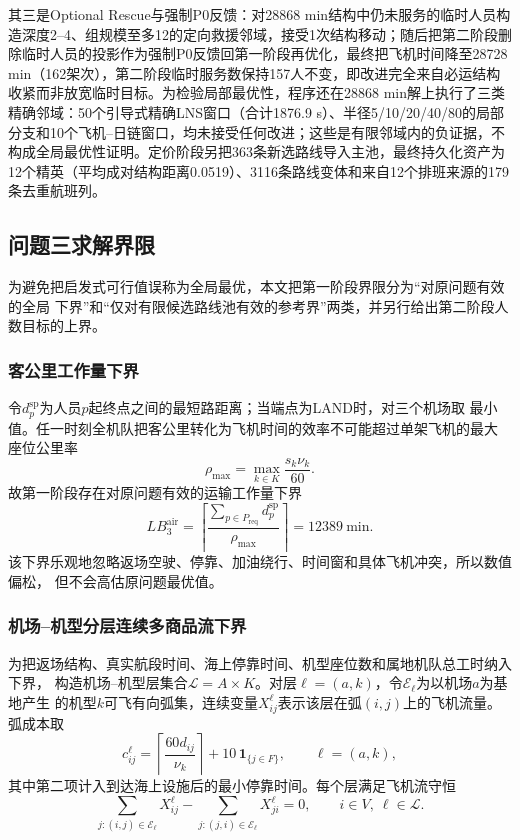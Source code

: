 \documentclass[UTF8,a4paper,zihao=5]{ctexart}
\begin{document}
其三是Optional Rescue与强制P0反馈：对28868 min结构中仍未服务的临时人员构造深度2--4、组规模至多12的定向救援邻域，接受1次结构移动；随后把第二阶段删除临时人员的投影作为强制P0反馈回第一阶段再优化，最终把飞机时间降至28728 min（162架次），第二阶段临时服务数保持157人不变，即改进完全来自必运结构收紧而非放宽临时目标。为检验局部最优性，程序还在28868 min解上执行了三类精确邻域：50个引导式精确LNS窗口（合计1876.9 s）、半径5/10/20/40/80的局部分支和10个飞机--日链窗口，均未接受任何改进；这些是有限邻域内的负证据，不构成全局最优性证明。定价阶段另把363条新选路线导入主池，最终持久化资产为12个精英（平均成对结构距离0.0519）、3116条路线变体和来自12个排班来源的179条去重航班列。

\subsection{问题三求解界限}

为避免把启发式可行值误称为全局最优，本文把第一阶段界限分为“对原问题有效的全局
下界”和“仅对有限候选路线池有效的参考界”两类，并另行给出第二阶段人数目标的上界。

\subsubsection{客公里工作量下界}

令$d_p^{\mathrm{sp}}$为人员$p$起终点之间的最短路距离；当端点为LAND时，对三个机场取
最小值。任一时刻全机队把客公里转化为飞机时间的效率不可能超过单架飞机的最大
座位公里率
\begin{equation}
  \rho_{\max}=\max_{k\in K}\frac{s_k\nu_k}{60}.
  \label{eq:q3-seat-km-rate}
\end{equation}
故第一阶段存在对原问题有效的运输工作量下界
\begin{equation}
  LB_3^{\mathrm{air}}
  =\left\lceil
  \frac{\sum_{p\in P_{\mathrm{req}}}d_p^{\mathrm{sp}}}{\rho_{\max}}
  \right\rceil=12389\ \mathrm{min}.
  \label{eq:q3-aircraft-time-lb}
\end{equation}
该下界乐观地忽略返场空驶、停靠、加油绕行、时间窗和具体飞机冲突，所以数值偏松，
但不会高估原问题最优值。

\subsubsection{机场--机型分层连续多商品流下界}

为把返场结构、真实航段时间、海上停靠时间、机型座位数和属地机队总工时纳入下界，
构造机场--机型层集合$\mathcal{L}=A\times K$。对层$\ell=(a,k)$，令$\mathcal{E}_\ell$为以机场$a$为基地产生
的机型$k$可飞有向弧集，连续变量$X_{ij}^{\ell}$表示该层在弧$(i,j)$上的飞机流量。弧成本取
\begin{equation}
  c_{ij}^{\ell}=\left\lceil\frac{60d_{ij}}{\nu_k}\right\rceil
  +10\,\mathbf{1}_{\{j\in F\}},
  \qquad \ell=(a,k),
  \label{eq:q3-layered-arc-cost}
\end{equation}
其中第二项计入到达海上设施后的最小停靠时间。每个层满足飞机流守恒
\begin{equation}
  \sum_{j:(i,j)\in \mathcal{E}_\ell}X_{ij}^{\ell}
  -\sum_{j:(j,i)\in \mathcal{E}_\ell}X_{ji}^{\ell}=0,
  \qquad i\in V,\ \ell\in \mathcal{L}.
  \label{eq:q3-layered-aircraft-balance}
\end{equation}
\end{document}
